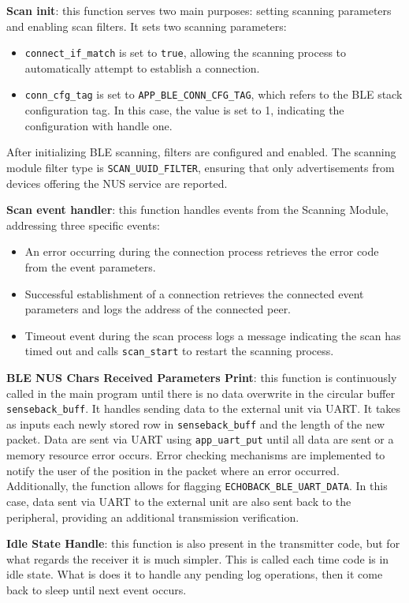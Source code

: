 \documentclass{Configuration_Files/PoliMi3i_thesis}
\begin{document}
\textbf{Scan init}: this function serves two main purposes: setting scanning parameters and enabling scan filters. It sets two scanning parameters:
\begin{itemize}
    \item \texttt{connect\_if\_match} is set to \texttt{true}, allowing the scanning process to automatically attempt to establish a connection.
    \item \texttt{conn\_cfg\_tag} is set to \texttt{APP\_BLE\_CONN\_CFG\_TAG}, which refers to the BLE stack configuration tag. In this case, the value is set to 1, indicating the configuration with handle one.
\end{itemize}
After initializing BLE scanning, filters are configured and enabled. The scanning module filter type is \texttt{SCAN\_UUID\_FILTER}, ensuring that only advertisements from devices offering the NUS service are reported.


\textbf{Scan event handler}: this function handles events from the Scanning Module, addressing three specific events:
\begin{itemize}
    \item An error occurring during the connection process retrieves the error code from the event parameters.
    \item Successful establishment of a connection retrieves the connected event parameters and logs the address of the connected peer.
    \item Timeout event during the scan process logs a message indicating the scan has timed out and calls \texttt{scan\_start} to restart the scanning process.
\end{itemize}

\textbf{BLE NUS Chars Received Parameters Print}: this function is continuously called in the main program until there is no data overwrite in the circular buffer \texttt{senseback\_buff}. It handles sending data to the external unit via UART. It takes as inputs each newly stored row in \texttt{senseback\_buff} and the length of the new packet. Data are sent via UART using \texttt{app\_uart\_put} until all data are sent or a memory resource error occurs. Error checking mechanisms are implemented to notify the user of the position in the packet where an error occurred. Additionally, the function allows for flagging \texttt{ECHOBACK\_BLE\_UART\_DATA}. In this case, data sent via UART to the external unit are also sent back to the peripheral, providing an additional transmission verification.

\textbf{Idle State Handle}: this function is also present in the transmitter code, but for what regards the receiver it is much simpler. This is called each time code is in idle state. What is does it to handle any pending log operations, then it come back to sleep until next event occurs.
\end{document}
